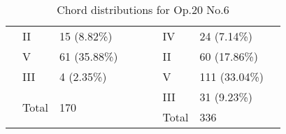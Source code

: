 \begin{table}[]
{\begin{tabular}{|l|l|l|l|l|l|l|l|l|}
 & II & 15 (8.82\%) &  &  &  & IV & 24 (7.14\%) &  \\ \cline{2-3} \cline{7-8}
 & V & 61 (35.88\%) &  &  &  & II & 60 (17.86\%) &  \\ \cline{2-3} \cline{7-8}
 & III & 4 (2.35\%) &  &  &  & V & 111 (33.04\%) &  \\ \cline{2-3} \cline{7-8}
 & \multirow{2}{*}{Total} & \multirow{2}{*}{170} &  &  &  & III & 31 (9.23\%) &  \\ \cline{7-8}
 &  &  &  &  &  & Total & 336 &  \\ \cline{1-4} \cline{6-9}
\end{tabular}
}
\caption{Chord distributions for Op.20 No.6}
\label{table:chords_op20n6}
\end{table}


\newpage

